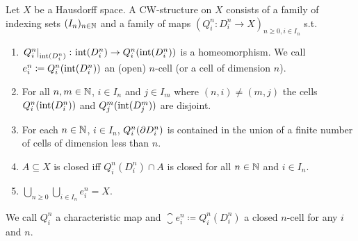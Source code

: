 \begin{defi}
    Let $X$ be a Hausdorff space. 
    A CW-structure on $X$ consists of a family of indexing sets $(I_n)_{n \in \mathbb{N}}$ and a family of maps $(Q_i^n\colon D_i^n\rightarrow X)_{n \ge 0, i \in I_n}$ s.t.
    \begin{enumerate}[label=(\roman*)]
        \item $\left.Q_i^n\right|_{\text{int}(D_i^n)}\colon \text{int}(D_i^n) \rightarrow Q_i^n(\text{int}(D_i^n))$ is a homeomorphism. We call $e_i^n \coloneq Q_i^n(\text{int}(D_i^n))$ an (open) $n$-cell (or a cell of dimension $n$).
        \item For all $n, m \in \mathbb{N}$, $i \in I_n$ and $j \in I_m$ where $(n, i) \ne (m, j)$ the cells $Q_i^n(\text{int}(D_i^n))$ and $Q_j^m(\text{int}(D_j^m))$ are disjoint.
        \item For each $n \in \mathbb{N}$, $i \in I_n$, $Q_i^n(\partial D_i^n)$ is contained in the union of a finite number of cells of dimension less than $n$.
        \item $A \subseteq X$ is closed iff $Q_i^n(D_i^n) \cap A$ is closed for all $n \in \mathbb{N}$ and $i \in I_n$.
        \item $\bigcup_{n \ge 0}\bigcup_{i \in I_n}e_i^n = X$.
    \end{enumerate}
    We call $Q_i^n$ a characteristic map and $\closure{e}_i^n \coloneq Q_i^n(D_i^n)$ a closed $n$-cell for any $i$ and $n$.
\end{defi}